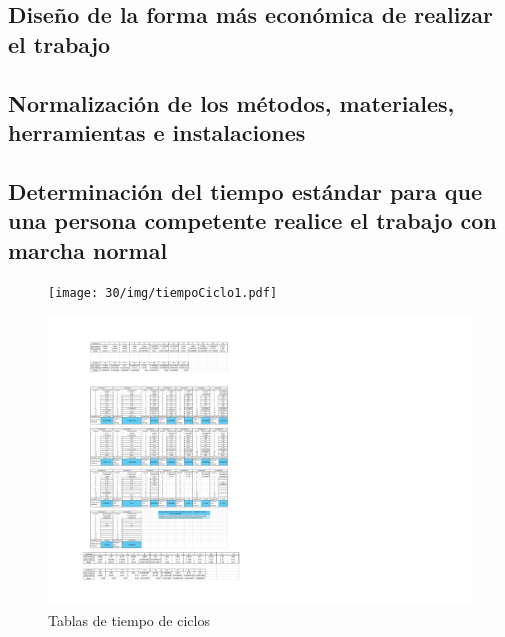     \subsection{Diseño de la forma más económica de realizar el trabajo}
    
    \subsection{Normalización de los métodos, materiales, herramientas e instalaciones}
    
    \subsection{Determinación del tiempo estándar para que una persona competente realice el trabajo con marcha normal}
    \begin{figure}[H]
        \centering
        \texttt{[image: 30/img/tiempoCiclo1.pdf]}
        \label{fig:tiempoCiclo}
    \end{figure}
    \begin{figure}[H]
        \centering
        \includegraphics[scale=0.40]{30/img/tiempoCiclos2.pdf}
        \caption{Tablas de tiempo de ciclos}
        \label{fig:tiempoCiclo}
    \end{figure}
